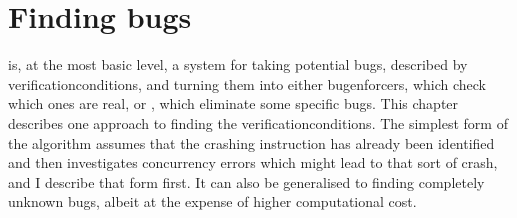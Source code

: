 \chapter{Finding bugs}
\label{sect:derive}


{\Technique} is, at the most basic level, a system for taking
potential bugs, described by \glspl{verificationcondition}, and
turning them into either \glspl{bugenforcer}, which check which ones
are real, or {\genfixes}, which eliminate some specific bugs.  This
chapter describes one approach to finding the
\glspl{verificationcondition}.  The simplest form of the algorithm
assumes that the crashing instruction has already been identified and
then investigates concurrency errors which might lead to that sort of
crash, and I describe that form first.  It can also be generalised to
finding completely unknown bugs, albeit at the expense of higher
computational cost.

